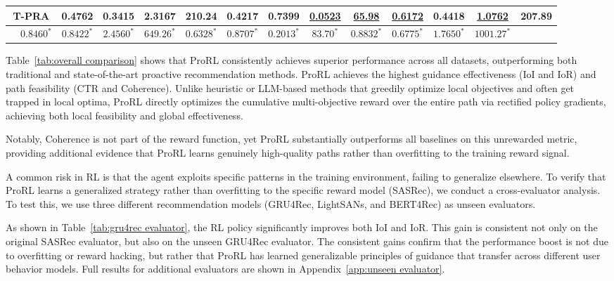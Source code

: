 \begin{table}[t]
{\begin{tabular}{c c cccc cccc cccc}
            \multicolumn{2}{c}{T-PRA}
            & 0.4762 & 0.3415 & 2.3167 & 210.24 & 0.4217 & 0.7399
            & \underline{0.0523} & \underline{65.98} & \underline{0.6172} & 0.4418 & \underline{1.0762} & 207.89 \\
        \hline
        \midrule
            \rowcolor{tableours}
            \multicolumn{2}{c}{\textbf{ProRL (Ours)}}
            & $\mathbf{0.8460}^{*}$ & $\mathbf{0.8422}^{*}$ & $\mathbf{2.4560}^{*}$ & $\mathbf{649.26}^{*}$ & $\mathbf{0.6328}^{*}$ & $\mathbf{0.8707}^{*}$ &
            $\mathbf{0.2013}^{*}$ & $\mathbf{83.70}^{*}$ & $\mathbf{0.8832}^{*}$ & $\mathbf{0.6775}^{*}$ & $\mathbf{1.7650}^{*}$ & $\mathbf{1001.27}^{*}$ \\

      \bottomrule[1.5pt]
      \end{tabular}
      }
\end{table}

Table~\ref{tab:overall comparison} shows that ProRL consistently achieves superior performance across all datasets, outperforming both traditional and state-of-the-art proactive recommendation methods. ProRL achieves the highest guidance effectiveness (IoI and IoR) and path feasibility (CTR and Coherence). Unlike heuristic or LLM-based methods that greedily optimize local objectives and often get trapped in local optima, ProRL directly optimizes the cumulative multi-objective reward over the entire path via rectified policy gradients, achieving both local feasibility and global effectiveness.

Notably, Coherence is not part of the reward function, yet ProRL substantially outperforms all baselines on this unrewarded metric, providing additional evidence that ProRL learns genuinely high-quality paths rather than overfitting to the training reward signal.


A common risk in RL is that the agent exploits specific patterns in the training environment, failing to generalize elsewhere. To verify that ProRL learns a generalized strategy rather than overfitting to the specific reward model (SASRec), we conduct a cross-evaluator analysis. To test this, we use three different recommendation models (GRU4Rec, LightSANs, and BERT4Rec) as unseen evaluators.

As shown in Table~\ref{tab:gru4rec evaluator}, the RL policy significantly improves both IoI and IoR. This gain is consistent not only on the original SASRec evaluator, but also on the unseen GRU4Rec evaluator. The consistent gains confirm that the performance boost is not due to overfitting or reward hacking, but rather that ProRL has learned generalizable principles of guidance that transfer across different user behavior models. Full results for additional evaluators are shown in Appendix~\ref{app:unseen evaluator}.


